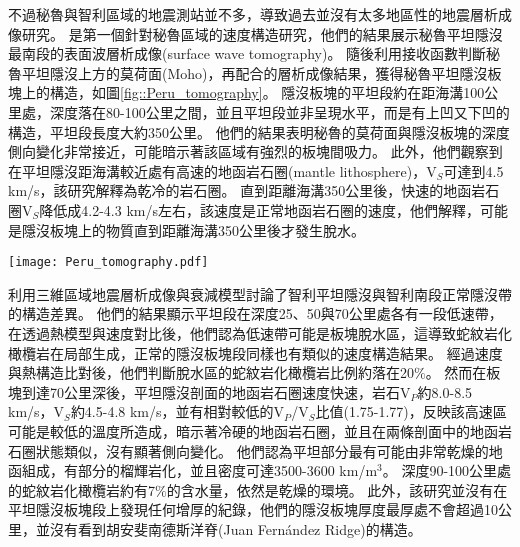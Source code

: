 不過秘魯與智利區域的地震測站並不多，導致過去並沒有太多地區性的地震層析成像研究。
\citealp{Ma2014}是第一個針對秘魯區域的速度構造研究，他們的結果展示秘魯平坦隱沒最南段的表面波層析成像(surface wave tomography)。
隨後\citealp{Ma2015}利用接收函數判斷秘魯平坦隱沒上方的莫荷面(Moho)，再配合\citealp{Ma2014}的層析成像結果，獲得秘魯平坦隱沒板塊上的構造，如圖\ref{fig::Peru_tomography}。
隱沒板塊的平坦段約在距海溝100公里處，深度落在80-100公里之間，並且平坦段並非呈現水平，而是有上凹又下凹的構造，平坦段長度大約350公里。
他們的結果表明秘魯的莫荷面與隱沒板塊的深度側向變化非常接近，可能暗示著該區域有強烈的板塊間吸力。
此外，他們觀察到在平坦隱沒距海溝較近處有高速的地函岩石圈(mantle lithosphere)，V$_S$可達到4.5 km/s，該研究解釋為乾冷的岩石圈。
直到距離海溝350公里後，快速的地函岩石圈V$_S$降低成4.2-4.3 km/s左右，該速度是正常地函岩石圈的速度，他們解釋，可能是隱沒板塊上的物質直到距離海溝350公里後才發生脫水。

\begin{figure*}[ht!]
    \centering
    \texttt{[image: Peru\_tomography.pdf]}
    \caption[秘魯平坦隱沒南段地震學研究結果與解釋圖，摘自\citealp{Ma2015}]{秘魯平坦隱沒南段地震學研究結果與解釋圖，摘自\citealp{Ma2015}。(a)深度80公里的V$_SV$速度構造，來自\citealp{Ma2014}。圖中左上方標示高速地函岩石圈與正常地函岩石圈的分界。紅色虛線標示出於20公里深的地素帶範圍，該低速帶被解釋為熔融區。粉紅色線為板塊等深度線。紅色實線為圖(C)剖面位置。灰色點為該研究所使用的側站位置。(b)板塊等深度圖，各顏色點為接收函數轉換波的地殼入射點，顏色代表不同深度。灰色點為該研究所使用的側站位置。(c)AA'剖面剪力波(shear wave)速度構造圖，白色點與紅色點分別為接收函數於西北地震事件群雨東南地震事件群所獲得之板塊深度。
    }
    \label{fig::Peru_tomography}
\end{figure*}

\citealp{Marot2014}利用三維區域地震層析成像與衰減模型討論了智利平坦隱沒與智利南段正常隱沒帶的構造差異。
他們的結果顯示平坦段在深度25、50與70公里處各有一段低速帶，在透過熱模型與速度對比後，他們認為低速帶可能是板塊脫水區，這導致蛇紋岩化橄欖岩在局部生成，正常的隱沒板塊段同樣也有類似的速度構造結果。
經過速度與熱構造比對後，他們判斷脫水區的蛇紋岩化橄欖岩比例約落在20$\%$。
然而在板塊到達70公里深後，平坦隱沒剖面的地函岩石圈速度快速，岩石V$_P$約8.0-8.5 km/s，V$_S$約4.5-4.8 km/s，並有相對較低的V$_P$/V$_S$比值(1.75-1.77)，反映該高速區可能是較低的溫度所造成，暗示著冷硬的地函岩石圈，並且在兩條剖面中的地函岩石圈狀態類似，沒有顯著側向變化。
他們認為平坦部分最有可能由非常乾燥的地函組成，有部分的榴輝岩化，並且密度可達3500-3600 km/m$^3$。
深度90-100公里處的蛇紋岩化橄欖岩約有7$\%$的含水量，依然是乾燥的環境。
此外，該研究並沒有在平坦隱沒板塊段上發現任何增厚的紀錄，他們的隱沒板塊厚度最厚處不會超過10公里，並沒有看到胡安斐南德斯洋脊(Juan Fernández Ridge)的構造。

